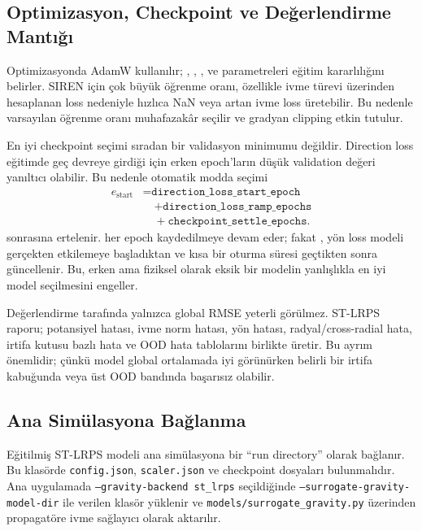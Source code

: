 \subsection{Optimizasyon, Checkpoint ve Değerlendirme Mantığı}

Optimizasyonda AdamW kullanılır; , , ,  ve  parametreleri eğitim kararlılığını belirler. SIREN için çok büyük öğrenme oranı, özellikle ivme türevi üzerinden hesaplanan loss nedeniyle hızlıca NaN veya artan ivme loss üretebilir. Bu nedenle varsayılan öğrenme oranı muhafazakâr seçilir ve gradyan clipping etkin tutulur.

En iyi checkpoint seçimi sıradan bir validasyon minimumu değildir. Direction loss eğitimde geç devreye girdiği için erken epoch'ların düşük validation değeri yanıltıcı olabilir. Bu nedenle otomatik modda  seçimi
\[
\begin{aligned}
e_{\mathrm{start}}
&= \texttt{direction\_loss\_start\_epoch} \\
&\quad+ \texttt{direction\_loss\_ramp\_epochs} \\
&\quad+ \texttt{checkpoint\_settle\_epochs}.
\end{aligned}
\]
sonrasına ertelenir.  her epoch kaydedilmeye devam eder; fakat , yön loss modeli gerçekten etkilemeye başladıktan ve kısa bir oturma süresi geçtikten sonra güncellenir. Bu, erken ama fiziksel olarak eksik bir modelin yanlışlıkla en iyi model seçilmesini engeller.

Değerlendirme tarafında yalnızca global RMSE yeterli görülmez. ST-LRPS raporu; potansiyel hatası, ivme norm hatası, yön hatası, radyal/cross-radial hata, irtifa kutusu bazlı hata ve OOD hata tablolarını birlikte üretir. Bu ayrım önemlidir; çünkü model global ortalamada iyi görünürken belirli bir irtifa kabuğunda veya üst OOD bandında başarısız olabilir.

\subsection{Ana Simülasyona Bağlanma}

Eğitilmiş ST-LRPS modeli ana simülasyona bir ``run directory'' olarak bağlanır. Bu klasörde \texttt{config.json}, \texttt{scaler.json} ve checkpoint dosyaları bulunmalıdır. Ana uygulamada \texttt{--gravity-backend st\_lrps} seçildiğinde \texttt{--surrogate-gravity-model-dir} ile verilen klasör yüklenir ve \texttt{models/surrogate\_gravity.py} üzerinden propagatöre ivme sağlayıcı olarak aktarılır.

